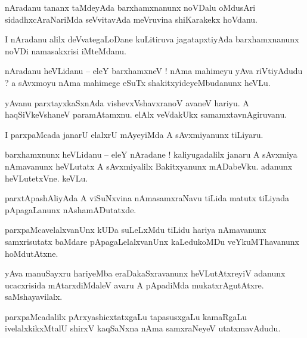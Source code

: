 \documentclass{article}
\begin{document}
\begin{mn}%
nAradanu tananx taMdeyAda barxhamxnanunx noVDalu oMdusAri sidadhxcAraNariMda seVvitavAda meVruvina 
shiKarakekx hoVdanu.
\end{mn}

\begin{mn}%
I nAradanu alilx deVvategaLoDane kuLitiruva jagatapxtiyAda barxhamxnanunx noVDi namasakxrisi 
iMteMdanu.
\end{mn}

\begin{mn}%
nAradanu heVLidanu -- eleY barxhamxneV ! nAma mahimeyu yAva riVtiyAdudu ? a sAvxmoyu nAma mahimege 
eSuTx shakitxyideyeMbudanunx heVLu.
\end{mn}

\begin{mn}%
yAvanu parxtayxkaSxnAda vishevxVshavxranoV avaneV hariyu. A  haqSiVkeVshaneV paramAtamxnu. elAlx 
veVdakUkx samamxtavnAgiruvanu.
\end{mn}

\begin{mn}%
I parxpaMcada janarU elalxrU mAyeyiMda A sAvxmiyanunx tiLiyaru.
\end{mn}

\begin{mn}%
barxhamxnunx heVLidanu -- eleY nAradane ! kaliyugadalilx janaru A sAvxmiya nAmavanunx heVLutatx A 
sAvxmiyalilx Bakitxyanunx mADabeVku. adanunx heVLutetxVne. keVLu.
\end{mn}

\begin{mn}%
parxtApashAliyAda A viSuNxvina nAmasamxraNavu tiLida matutx tiLiyada pApagaLanunx nAshamADutatxde.
\end{mn}

\begin{mn}%
parxpaMcavelalxvanUnx kUDa suLeLxMdu tiLidu hariya nAmavanunx samxrisutatx baMdare 
pApagaLelalxvanUnx kaLedukoMDu veYkuMThavanunx hoMdutAtxne.
\end{mn}

\begin{mn}%
yAva manuSayxru hariyeMba eraDakaSxravanunx heVLutAtxreyiV adanunx ucacxrisida mAtarxdiMdaleV avaru 
A pApadiMda mukatxrAgutAtxre. saMshayavilalx.
\end{mn}

\begin{mn}%
parxpaMcadalilx pArxyashicxtatxgaLu tapasusxgaLu kamaRgaLu ivelalxkikxMtalU shirxV kaqSaNxna nAma 
samxraNeyeV utatxmavAdudu.
\end{mn}
\end{document}

